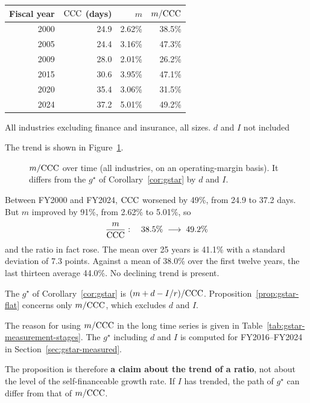 \begin{center}
\begin{tabular}{@{}rrrr@{}}
\toprule
Fiscal year & $\mathrm{CCC}$ (days) & $m$ & $m/\mathrm{CCC}$ \\
\midrule
2000 & 24.9 & 2.62\% & 38.5\% \\
2005 & 24.4 & 3.16\% & 47.3\% \\
2009 & 28.0 & 2.01\% & 26.2\% \\
2015 & 30.6 & 3.95\% & 47.1\% \\
2020 & 35.4 & 3.06\% & 31.5\% \\
2024 & 37.2 & 5.01\% & 49.2\% \\
\bottomrule
\end{tabular}
\label{tab:mccc-trend}
\end{center}
\begin{center}\footnotesize All industries excluding finance and insurance, all sizes. $d$ and $I$ not included\end{center}

The trend is shown in Figure~\ref{fig:gstar-trend}.

\begin{figure}[htbp]
\centering
{}
\caption{$m/\mathrm{CCC}$ over time (all industries, on an operating-margin basis). It differs from the $g^\star$ of Corollary~\ref{cor:gstar} by $d$ and $I$.}
\label{fig:gstar-trend}
\end{figure}

\begin{proposition}
\label{prop:gstar-flat}
Between FY2000 and FY2024, $\mathrm{CCC}$ worsened by 49\%, from 24.9 to 37.2 days. But $m$ improved
by 91\%, from 2.62\% to 5.01\%, so
\[
\frac{m}{\mathrm{CCC}} : \quad 38.5\% \;\longrightarrow\; 49.2\%
\]
and the ratio in fact rose. The mean over 25 years is 41.1\% with a standard deviation of 7.3
points. Against a mean of 38.0\% over the first twelve years, the last thirteen average
44.0\%. No declining trend is present.
\end{proposition}

\begin{remark}
\label{rem:gstar-flat-caveat}
The $g^\star$ of Corollary~\ref{cor:gstar} is $(m+d-I/r)/\mathrm{CCC}$.
Proposition~\ref{prop:gstar-flat} concerns only $m/\mathrm{CCC}$, which excludes $d$ and $I$.

The reason for using $m/\mathrm{CCC}$ in the long time series is given in
Table~\ref{tab:gstar-measurement-stages}. The $g^\star$ including $d$ and $I$ is computed for
FY2016--FY2024 in Section~\ref{sec:gstar-measured}.

The proposition is therefore \textbf{a claim about the trend of a ratio}, not about the level
of the self-financeable growth rate. If $I$ has trended, the path of $g^\star$ can differ
from that of $m/\mathrm{CCC}$.
\end{remark}

